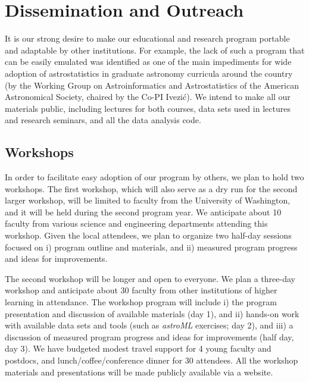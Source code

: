 \section{Dissemination and Outreach}
\label{sec:outreach}


It is our strong desire to make our educational and research
program portable and adaptable by other institutions. For example, 
the lack of such a program that can be easily emulated was identified 
as one of the main impediments for wide adoption of astrostatistics
in graduate astronomy curricula around the country (by the Working 
Group on Astroinformatics and Astrostatistics of the American Astronomical
Society, chaired by the Co-PI Ivezi\'{c}).  We intend to make all our
materials public, including lectures for both courses, data sets used
in lectures and research seminars, and all the data analysis code. 


\subsection{Workshops} 
\label{sec:workshop}

In order to facilitate easy adoption of our program by others, we 
plan to hold two workshops. The first workshop, which will also 
serve as a dry run for the second larger workshop, will be limited to
faculty from the University of Washington, and it will be held during
the second program year. We anticipate about 10 faculty from various 
science and engineering departments attending this workshop. Given 
the local attendees, we plan to organize two half-day sessions focused 
on i) program outline and materials, and ii) measured program progress 
and ideas for improvements. 

The second workshop will be longer and open to everyone. We plan a 
three-day workshop and anticipate about 30 faculty from other
institutions of higher learning in attendance. The workshop program
will include i) the program presentation and discussion of available 
materials (day 1), and ii) hands-on work with available data sets and
tools (such as {\it astroML} exercises; day 2), and iii) a discussion
of measured program progress and ideas for improvements (half day, day
3). We have budgeted modest travel support for 4 young faculty and
postdocs, and lunch/coffee/conference dinner for 30 attendees. 
All the workshop materials and presentations will be made publicly
available via a website. 
